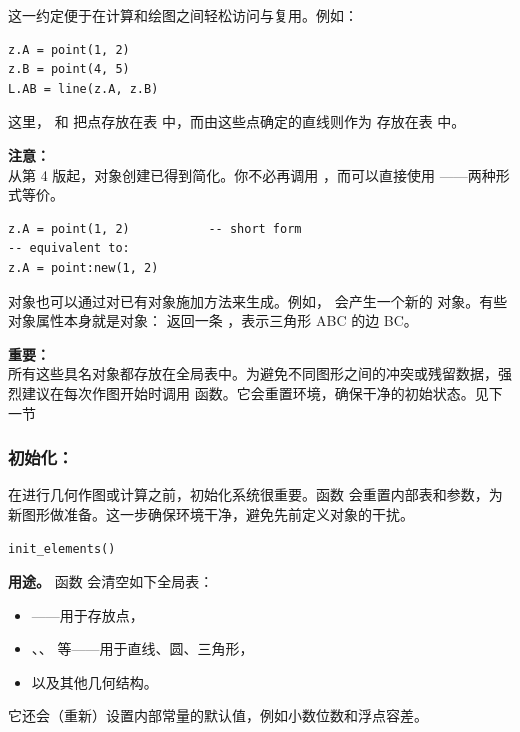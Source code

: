 这一约定便于在计算和绘图之间轻松访问与复用。例如：

\begin{mybox}
\begin{verbatim}
z.A = point(1, 2)
z.B = point(4, 5)
L.AB = line(z.A, z.B)
\end{verbatim}
\end{mybox}


这里， 和  把点存放在表  中，而由这些点确定的直线则作为  存放在表  中。

\vspace{1em}
\tkzRHand{} \textbf{注意：}\\
从第 4 版起，对象创建已得到简化。你不必再调用 ，而可以直接使用 ——两种形式等价。

\begin{mybox}
\begin{verbatim}
z.A = point(1, 2)           -- short form
-- equivalent to:
z.A = point:new(1, 2)
\end{verbatim}
\end{mybox}

对象也可以通过对已有对象施加方法来生成。例如， 会产生一个新的  对象。有些对象属性本身就是对象： 返回一条 ，表示三角形 ABC 的边 BC。

\vspace{1em}
\tkzRHand{} \textbf{重要：}\\
所有这些具名对象都存放在全局表中。为避免不同图形之间的冲突或残留数据，强烈建议在每次作图开始时调用  函数。它会重置环境，确保干净的初始状态。见下一节

\subsubsection{初始化：}

在进行几何作图或计算之前，初始化系统很重要。函数  会重置内部表和参数，为新图形做准备。这一步确保环境干净，避免先前定义对象的干扰。

\begin{mybox}
\begin{verbatim}
init_elements()
\end{verbatim}
\end{mybox}

\textbf{用途。}
函数  会清空如下全局表：
\begin{itemize}
  \item {}——用于存放点，
  \item {}、、 等——用于直线、圆、三角形，
  \item 以及其他几何结构。
\end{itemize}
它还会（重新）设置内部常量的默认值，例如小数位数和浮点容差。

